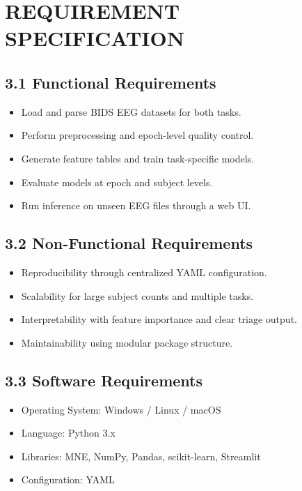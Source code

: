 \documentclass[12pt,a4paper]{report}
\begin{document}
\chapter{REQUIREMENT SPECIFICATION}
\section*{3.1 Functional Requirements}
\begin{itemize}
    \item Load and parse BIDS EEG datasets for both tasks.
    \item Perform preprocessing and epoch-level quality control.
    \item Generate feature tables and train task-specific models.
    \item Evaluate models at epoch and subject levels.
    \item Run inference on unseen EEG files through a web UI.
\end{itemize}

\section*{3.2 Non-Functional Requirements}
\begin{itemize}
    \item Reproducibility through centralized YAML configuration.
    \item Scalability for large subject counts and multiple tasks.
    \item Interpretability with feature importance and clear triage output.
    \item Maintainability using modular package structure.
\end{itemize}

\section*{3.3 Software Requirements}
\begin{itemize}
    \item Operating System: Windows / Linux / macOS
    \item Language: Python 3.x
    \item Libraries: MNE, NumPy, Pandas, scikit-learn, Streamlit
    \item Configuration: YAML
\end{itemize}
\end{document}
